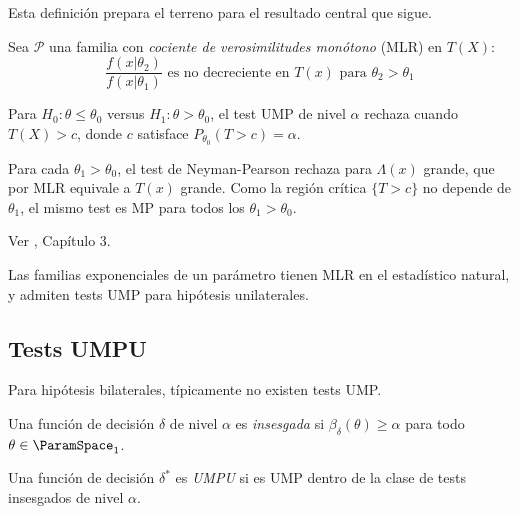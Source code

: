 Esta definición prepara el terreno para el resultado central que sigue.

\begin{theorem}
	\label{thm:ch4-mlr}
	Sea $\mathcal{P}$ una familia con \emph{cociente de verosimilitudes monótono}
	(MLR) en $T(X)$:
	\[
		\frac{f(x|\theta_2)}{f(x|\theta_1)} \text{ es no decreciente en } T(x)
		\text{ para } \theta_2 > \theta_1
	\]

	Para $H_0: \theta \leq \theta_0$ versus $H_1: \theta > \theta_0$, el test
	UMP de nivel $\alpha$ rechaza cuando $T(X) > c$, donde $c$ satisface
	$P_{\theta_0}(T > c) = \alpha$.
\end{theorem}

\begin{proofsketch}
	Para cada $\theta_1 > \theta_0$, el test de Neyman-Pearson rechaza para
	$\Lambda(x)$ grande, que por MLR equivale a $T(x)$ grande. Como la región
	crítica $\{T > c\}$ no depende de $\theta_1$, el mismo test es MP para
	todos los $\theta_1 > \theta_0$.

	Ver \citet{lehmann2005testing}, Capítulo 3. 
\end{proofsketch}

\begin{corollary}
	\label{cor:ch4-exp-mlr}
	Las familias exponenciales de un parámetro tienen MLR en el estadístico
	natural, y admiten tests UMP para hipótesis unilaterales.
\end{corollary}

\subsection{Tests UMPU}
\label{sec:ch4-umpu}

Para hipótesis bilaterales, típicamente no existen tests UMP.

\begin{definition}
	\label{def:ch4-umpu}
	Una función de decisión $\delta$ de nivel $\alpha$ es \emph{insesgada} si
	$\beta_\delta(\theta) \geq \alpha$ para todo $\theta \in \ParamSpace_1$.

	Una función de decisión $\delta^*$ es \emph{UMPU} si es UMP dentro de la clase de tests
	insesgados de nivel $\alpha$.
\end{definition}

